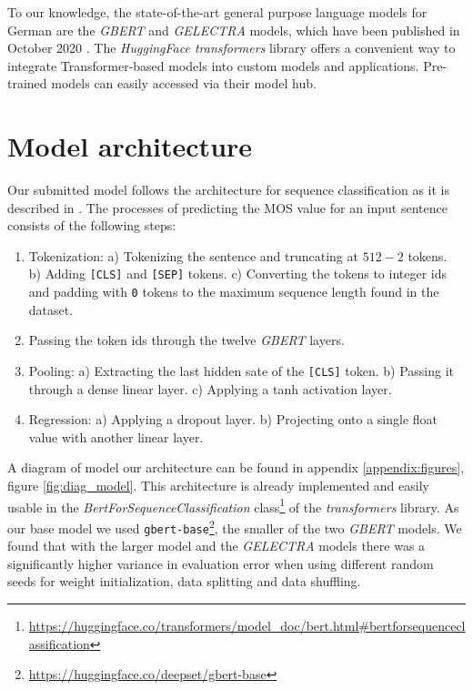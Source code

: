 \documentclass[11pt, DIV12]{scrartcl}
\begin{document}
To our knowledge, the state-of-the-art general purpose language models for German are the \textit{GBERT} and \textit{GELECTRA} models, which have been published in October 2020 \cite{DBLP:journals/corr/abs-2010-10906}. The \textit{HuggingFace transformers} library \cite{DBLP:journals/corr/abs-1910-03771} offers a convenient way to integrate Transformer-based models into custom models and applications. Pre-trained models can easily accessed via their model hub.

\section{Model architecture}
\label{sec:model}

Our submitted model follows the architecture for sequence classification as it is described in \cite{DBLP:journals/corr/abs-1810-04805}. The processes of predicting the MOS value for an input sentence consists of the following steps:  

\begin{enumerate}
\setlength\itemsep{0pt}
\item Tokenization: a) Tokenizing the sentence and truncating at \(512-2\) tokens. \\ b) Adding \texttt{[CLS]} and \texttt{[SEP]} tokens. c) Converting the tokens to integer ids and padding with \texttt{0} tokens to the maximum sequence length found in the dataset. 
\item Passing the token ids through the twelve \textit{GBERT} layers.
\item Pooling: a) Extracting the last hidden sate of the \texttt{[CLS]} token. b) Passing it through a dense linear layer. c) Applying a tanh activation layer.
\item Regression: a) Applying a dropout layer. b) Projecting onto a single float value with another linear layer.
\end{enumerate}

A diagram of model our architecture can be found in appendix \ref{appendix:figures}, figure \ref{fig:diag_model}. This architecture is already implemented and easily usable in the \textit{BertForSequenceClassification} class\footnote{\url{https://huggingface.co/transformers/model_doc/bert.html#bertforsequenceclassification}} of the \textit{transformers} library.
As our base model we used \texttt{gbert-base}\footnote{\url{https://huggingface.co/deepset/gbert-base}}, the smaller of the two \textit{GBERT} models. We found that with the larger model and the \textit{GELECTRA} models there was a significantly higher variance in evaluation error when using different random seeds for weight initialization, data splitting and data shuffling.
\end{document}

